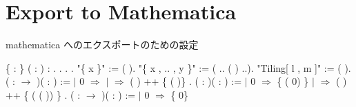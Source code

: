 \documentclass[12pt]{report}
\begin{document}
\section{Export to Mathematica}
mathematica へのエクスポートのための設定
 \begin{coqdoccode}
\coqdocemptyline
\coqdocnoindent
{}  \{ : \} (  :  ) : .\coqdoceol
\coqdocnoindent
{}.\coqdoceol
\coqdocnoindent
{} .\coqdoceol
\coqdocnoindent
{}.\coqdoceol
\coqdocnoindent
{} "\{ x \}" := (  ).\coqdoceol
\coqdocnoindent
{} "\{ x , .. , y \}" := (  .. (  ) ..).\coqdoceol
\coqdocnoindent
{} "Tiling[ l , m ]" := (  ).\coqdoceol
\coqdocnoindent
{}  ( :  \ensuremath{\rightarrow} )( : ) :=\coqdoceol
\coqdocindent{0.50em}
  \coqdoceol
\coqdocindent{1.50em}
\ensuremath{|} 0 \ensuremath{\Rightarrow} \coqdoceol
\coqdocindent{1.50em}
\ensuremath{|}   \ensuremath{\Rightarrow} (  ) ++ \{ ( )\}\coqdoceol
\coqdocindent{0.50em}
.\coqdoceol
\coqdocnoindent
{}  ( : )(  : ) :=\coqdoceol
\coqdocindent{0.50em}
  \coqdoceol
\coqdocindent{1.50em}
\ensuremath{|} 0 \ensuremath{\Rightarrow} \{ ( 0) \}\coqdoceol
\coqdocindent{1.50em}
\ensuremath{|}   \ensuremath{\Rightarrow} (   ) ++ \{ ( ( )) \}\coqdoceol
\coqdocindent{0.50em}
.\coqdoceol
\coqdocnoindent
{}  ( :  \ensuremath{\rightarrow} )( : ) :=\coqdoceol
\coqdocindent{0.50em}
  \coqdoceol
\coqdocindent{1.50em}
\ensuremath{|} 0 \ensuremath{\Rightarrow} \{ 0\}\coqdoceol

\end{coqdoccode}
\end{document}

